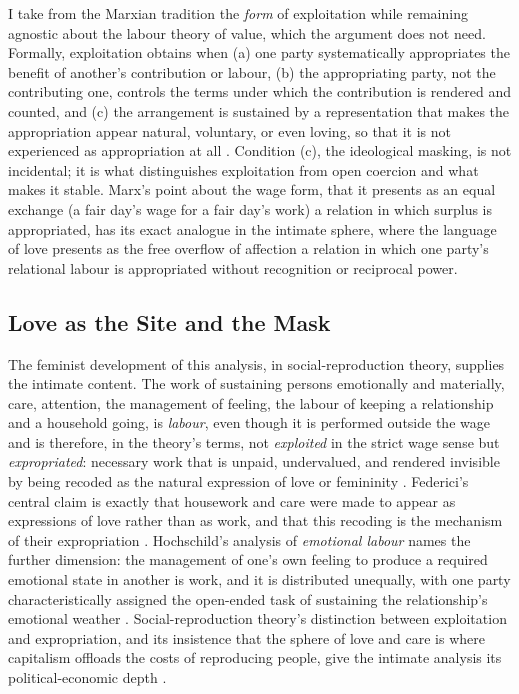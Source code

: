 I take from the Marxian tradition the \emph{form} of exploitation while remaining agnostic about the labour theory of value, which the argument does not need. Formally, exploitation obtains when (a) one party systematically appropriates the benefit of another's contribution or labour, (b) the appropriating party, not the contributing one, controls the terms under which the contribution is rendered and counted, and (c) the arrangement is sustained by a representation that makes the appropriation appear natural, voluntary, or even loving, so that it is not experienced as appropriation at all \parencite[on the form of appropriation and its mystification, see][esp. the analysis of the wage form]{marx1867capital}. Condition (c), the ideological masking, is not incidental; it is what distinguishes exploitation from open coercion and what makes it stable. Marx's point about the wage form, that it presents as an equal exchange (a fair day's wage for a fair day's work) a relation in which surplus is appropriated, has its exact analogue in the intimate sphere, where the language of love presents as the free overflow of affection a relation in which one party's relational labour is appropriated without recognition or reciprocal power.

\subsection{Love as the Site and the Mask}

The feminist development of this analysis, in social-reproduction theory, supplies the intimate content. The work of sustaining persons emotionally and materially, care, attention, the management of feeling, the labour of keeping a relationship and a household going, is \emph{labour}, even though it is performed outside the wage and is therefore, in the theory's terms, not \emph{exploited} in the strict wage sense but \emph{expropriated}: necessary work that is unpaid, undervalued, and rendered invisible by being recoded as the natural expression of love or femininity \parencite{federici2012revolution, fraser2016contradictions}. Federici's central claim is exactly that housework and care were made to appear as expressions of love rather than as work, and that this recoding is the mechanism of their expropriation \parencite{federici2012revolution}. Hochschild's analysis of \emph{emotional labour} names the further dimension: the management of one's own feeling to produce a required emotional state in another is work, and it is distributed unequally, with one party characteristically assigned the open-ended task of sustaining the relationship's emotional weather \parencite{hochschild1983managed}. Social-reproduction theory's distinction between exploitation and expropriation, and its insistence that the sphere of love and care is where capitalism offloads the costs of reproducing people, give the intimate analysis its political-economic depth \parencite{bhattacharya2017social}.

